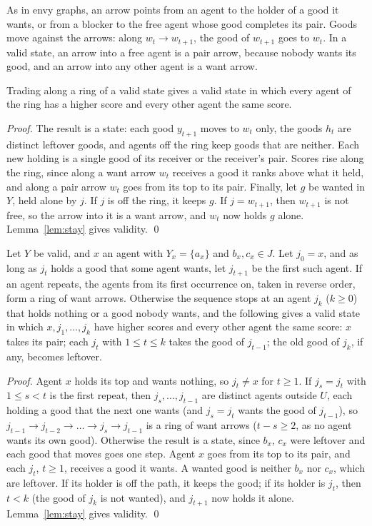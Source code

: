 \documentclass[runningheads,11pt]{llncs}
\begin{document}
\noindent As in envy graphs, an arrow points from an agent to the holder of a good it wants, or from a blocker to the free agent whose good completes its pair. Goods move against the arrows: along $w_t\to w_{t+1}$, the good of $w_{t+1}$ goes to $w_t$. In a valid state, an arrow into a free agent is a pair arrow, because nobody wants its good, and an arrow into any other agent is a want arrow.

\begin{lemma}[ring]\label{lem:ring}
Trading along a ring of a valid state gives a valid state in which every agent of the ring has a higher score and every other agent the same score.
\end{lemma}

\begin{proof}
The result is a state: each good $y_{t+1}$ moves to $w_t$ only, the goods $h_t$ are distinct leftover goods, and agents off the ring keep goods that are neither. Each new holding is a single good of its receiver or the receiver's pair. Scores rise along the ring, since along a want arrow $w_t$ receives a good it ranks above what it held, and along a pair arrow $w_t$ goes from its top to its pair. Finally, let $g$ be wanted in $Y$, held alone by $j$. If $j$ is off the ring, it keeps $g$. If $j=w_{t+1}$, then $w_{t+1}$ is not free, so the arrow into it is a want arrow, and $w_t$ now holds $g$ alone. Lemma~\ref{lem:stay} gives validity. \qed
\end{proof}

\begin{lemma}[chain]\label{lem:chain}
Let $Y$ be valid, and $x$ an agent with $Y_x=\{a_x\}$ and $b_x,c_x\in J$. Let $j_0=x$, and as long as $j_t$ holds a good that some agent wants, let $j_{t+1}$ be the first such agent. If an agent repeats, the agents from its first occurrence on, taken in reverse order, form a ring of want arrows. Otherwise the sequence stops at an agent $j_k$ ($k\ge0$) that holds nothing or a good nobody wants, and the following gives a valid state in which $x,j_1,\dots,j_k$ have higher scores and every other agent the same score: $x$ takes its pair; each $j_t$ with $1\le t\le k$ takes the good of $j_{t-1}$; the old good of $j_k$, if any, becomes leftover.
\end{lemma}

\begin{proof}
Agent $x$ holds its top and wants nothing, so $j_t\ne x$ for $t\ge1$. If $j_s=j_t$ with $1\le s<t$ is the first repeat, then $j_s,\dots,j_{t-1}$ are distinct agents outside $U$, each holding a good that the next one wants (and $j_s=j_t$ wants the good of $j_{t-1}$), so $j_{t-1}\to j_{t-2}\to\dots\to j_s\to j_{t-1}$ is a ring of want arrows ($t-s\ge2$, as no agent wants its own good). Otherwise the result is a state, since $b_x$, $c_x$ were leftover and each good that moves goes one step. Agent $x$ goes from its top to its pair, and each $j_t$, $t\ge1$, receives a good it wants. A wanted good is neither $b_x$ nor $c_x$, which are leftover. If its holder is off the path, it keeps the good; if its holder is $j_t$, then $t<k$ (the good of $j_k$ is not wanted), and $j_{t+1}$ now holds it alone. Lemma~\ref{lem:stay} gives validity. \qed
\end{proof}
\end{document}
